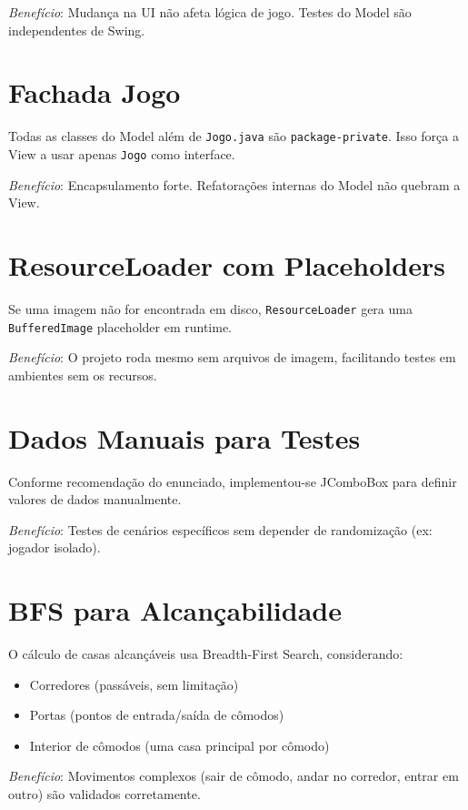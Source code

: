 \documentclass[12pt,a4paper]{report}
\begin{document}
\textit{Benefício}: Mudança na UI não afeta lógica de jogo. Testes do Model são independentes de Swing.

\section{Fachada Jogo}

Todas as classes do Model além de \texttt{Jogo.java} são \texttt{package-private}. Isso força a View a usar apenas \texttt{Jogo} como interface.

\textit{Benefício}: Encapsulamento forte. Refatorações internas do Model não quebram a View.

\section{ResourceLoader com Placeholders}

Se uma imagem não for encontrada em disco, \texttt{ResourceLoader} gera uma \texttt{BufferedImage} placeholder em runtime.

\textit{Benefício}: O projeto roda mesmo sem arquivos de imagem, facilitando testes em ambientes sem os recursos.

\section{Dados Manuais para Testes}

Conforme recomendação do enunciado, implementou-se JComboBox para definir valores de dados manualmente.

\textit{Benefício}: Testes de cenários específicos sem depender de randomização (ex: jogador isolado).

\section{BFS para Alcançabilidade}

O cálculo de casas alcançáveis usa Breadth-First Search, considerando:
\begin{itemize}
    \item Corredores (passáveis, sem limitação)
    \item Portas (pontos de entrada/saída de cômodos)
    \item Interior de cômodos (uma casa principal por cômodo)
\end{itemize}

\textit{Benefício}: Movimentos complexos (sair de cômodo, andar no corredor, entrar em outro) são validados corretamente.
\end{document}
